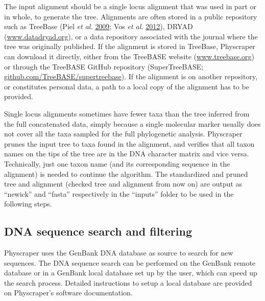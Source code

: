\documentclass[]{article}
\begin{document}
The input alignment should be a single locus alignment that was used in part or in whole, to generate the tree. Alignments are often stored in a public repository such as TreeBase (Piel \emph{et al.} \protect\hyperlink{ref-piel2009treebase}{2009}; Vos \emph{et al.} \protect\hyperlink{ref-vos2012nexml}{2012}),
DRYAD (\href{http://datadryad.org/}{www.datadryad.org}), or a data repository associated with the journal where the tree was originally published.
If the alignment is stored in TreeBase, Physcraper can download it directly,
either from the TreeBASE website (\href{https://treebase.org/}{www.treebase.org})
or through the TreeBASE GitHub repository (SuperTreeBASE; \href{https://github.com/TreeBASE/supertreebase}{github.com/TreeBASE/supertreebase}).
If the alignment is on another repository, or constitutes personal data, a path to a local copy of the alignment has to be provided.

Single locus alignments sometimes have fewer taxa than the tree inferred from the full concatenated data, simply because a single molecular marker usually does not cover all the taxa sampled for the full phylogenetic analysis. Physcraper prunes the input tree to taxa found in the alignment, and verifies that all taxon names on the tips of the tree are in the DNA character matrix and vice versa. Technically, just one taxon name (and its corresponding sequence in the alignment) is needed to continue the algorithm.
The standardized and pruned tree and alignment (checked tree and alignment from now on) are output as ``newick'' and ``fasta'' respectively in the ``inputs'' folder to be used in the following steps.

\hypertarget{dna-sequence-search-and-filtering}{%
\subsection{DNA sequence search and filtering}\label{dna-sequence-search-and-filtering}}

Physcraper uses the GenBank DNA database as source to search for new sequences. The DNA sequence search can be performed on the GenBank remote database or in a GenBank local database set up by the user, which can speed up the search process. Detailed instructions to setup a local database are provided on Physcraper's software documentation.
\end{document}
